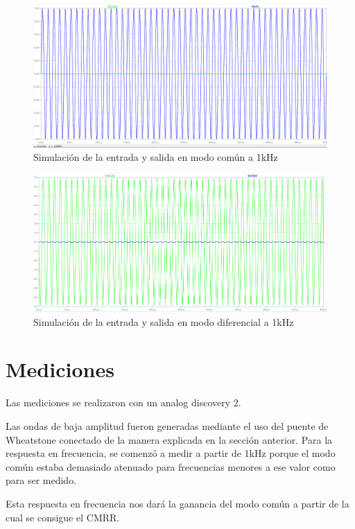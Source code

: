 \documentclass[../../tc_tp3_main.tex]{subfiles}
\begin{document}
	\begin{figure}[h!]	
		\centering
		\includegraphics[scale=0.4]{imagenes/ganancia_comun_simulado.png}
		\caption{Simulación de la entrada y salida en modo común a 1kHz}
		\label{fig:ej3_ganancia_comun_simulado}
	\end{figure}
	
	\begin{figure}[h!]	
		\centering
		\includegraphics[scale=0.4]{imagenes/ganancia_diferencial_simulado.png}
		\caption{Simulación de la entrada y salida en modo diferencial a 1kHz}
		\label{fig:ej3_ganancia_diferencial_simulado}
	\end{figure}
	
\section{Mediciones}

Las mediciones se realizaron con un analog discovery 2.\par
Las ondas de baja amplitud fueron generadas mediante el uso del puente de Wheatstone conectado de la manera explicada en la sección anterior.
Para la respuesta en frecuencia, se comenzó a medir a partir de 1kHz porque el modo común estaba demasiado atenuado para frecuencias menores a ese valor como para ser medido. \par
Esta respuesta en frecuencia nos dará la ganancia del modo común a partir de la cual se consigue el CMRR.
\end{document}
